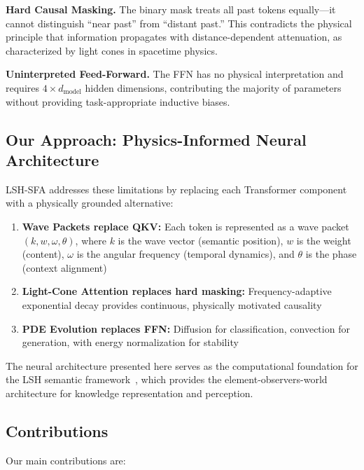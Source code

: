 \documentclass{article}
\begin{document}
\textbf{Hard Causal Masking.} The binary mask treats all past tokens equally---it cannot distinguish ``near past'' from ``distant past.'' This contradicts the physical principle that information propagates with distance-dependent attenuation, as characterized by light cones in spacetime physics.

\textbf{Uninterpreted Feed-Forward.} The FFN has no physical interpretation and requires $4 \times d_{\text{model}}$ hidden dimensions, contributing the majority of parameters without providing task-appropriate inductive biases.

\subsection{Our Approach: Physics-Informed Neural Architecture}

LSH-SFA addresses these limitations by replacing each Transformer component with a physically grounded alternative:

\begin{enumerate}
\item \textbf{Wave Packets replace QKV:} Each token is represented as a wave packet $(k, w, \omega, \theta)$, where $k$ is the wave vector (semantic position), $w$ is the weight (content), $\omega$ is the angular frequency (temporal dynamics), and $\theta$ is the phase (context alignment)
\item \textbf{Light-Cone Attention replaces hard masking:} Frequency-adaptive exponential decay provides continuous, physically motivated causality
\item \textbf{PDE Evolution replaces FFN:} Diffusion for classification, convection for generation, with energy normalization for stability
\end{enumerate}

The neural architecture presented here serves as the computational foundation for the LSH semantic framework~\cite{lsh-three-layer}, which provides the element-observers-world architecture for knowledge representation and perception.

\subsection{Contributions}

Our main contributions are:
\end{document}
